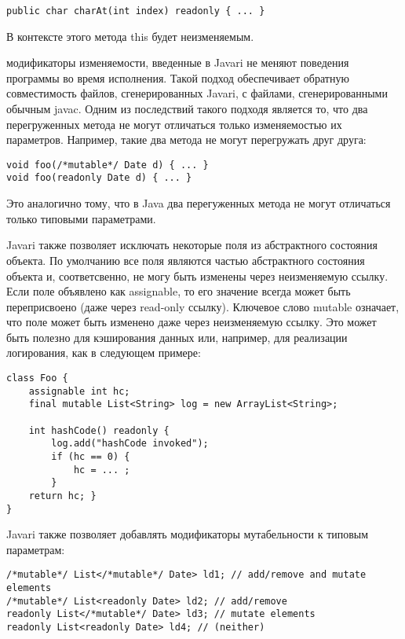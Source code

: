 \begin{lstlisting}[caption=readonly метод, label=code:readonly_method]
public char charAt(int index) readonly { ... }
\end{lstlisting}

В контексте этого метода this будет неизменяемым.

модификаторы изменяемости, введенные в Javari не меняют поведения программы во время исполнения. Такой подход обеспечивает обратную совместимость файлов, сгенерированных Javari, с файлами, сгенерированными обычным javac. Одним из последствий такого подходя является то, что два перегруженных метода не могут отличаться только изменяемостью их параметров. Например, такие два метода не могут перегружать друг друга:

\begin{lstlisting}[caption=Перегрузка методов, label=code:javari_method_overloading]
void foo(/*mutable*/ Date d) { ... } 
void foo(readonly Date d) { ... }
\end{lstlisting}

Это аналогично тому, что в Java два перегуженных метода не могут отличаться только типовыми параметрами.

Javari также позволяет исключать некоторые поля из абстрактного состояния объекта. По умолчанию все поля являются частью абстрактного состояния объекта и, соответсвенно, не могу быть изменены через неизменяемую ссылку. Если поле объявлено как assignable, то его значение всегда может быть переприсвоено (даже через read-only ссылку). Ключевое слово mutable означает, что поле может быть изменено даже через неизменяемую ссылку. Это может быть полезно для кэширования данных или, например, для реализации логирования, как в следующем примере:

\begin{lstlisting}[caption=assignable и mutable поля, label=code:assignable_mutable]
class Foo { 
    assignable int hc; 
    final mutable List<String> log = new ArrayList<String>;
    
    int hashCode() readonly { 
        log.add("hashCode invoked");
        if (hc == 0) { 
            hc = ... ;
        } 
    return hc; } 
}
\end{lstlisting}

Javari также позволяет добавлять модификаторы мутабельности к типовым параметрам:

\begin{lstlisting}[caption=Модификаторы мутабельности в типовых параметрах, label=code:javari_generic_local]
/*mutable*/ List</*mutable*/ Date> ld1; // add/remove and mutate elements 
/*mutable*/ List<readonly Date> ld2; // add/remove 
readonly List</*mutable*/ Date> ld3; // mutate elements 
readonly List<readonly Date> ld4; // (neither)
\end{lstlisting} 

